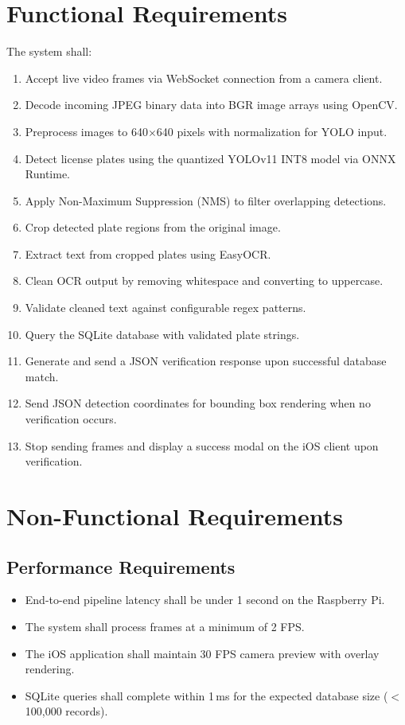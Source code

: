 \documentclass[11pt]{report}
\begin{document}
\section{Functional Requirements}
The system shall:
\begin{enumerate}
    \item Accept live video frames via WebSocket connection from a camera client.
    \item Decode incoming JPEG binary data into BGR image arrays using OpenCV.
    \item Preprocess images to 640$\times$640 pixels with normalization for YOLO input.
    \item Detect license plates using the quantized YOLOv11 INT8 model via ONNX Runtime.
    \item Apply Non-Maximum Suppression (NMS) to filter overlapping detections.
    \item Crop detected plate regions from the original image.
    \item Extract text from cropped plates using EasyOCR.
    \item Clean OCR output by removing whitespace and converting to uppercase.
    \item Validate cleaned text against configurable regex patterns.
    \item Query the SQLite database with validated plate strings.
    \item Generate and send a JSON verification response upon successful database match.
    \item Send JSON detection coordinates for bounding box rendering when no verification occurs.
    \item Stop sending frames and display a success modal on the iOS client upon verification.
\end{enumerate}

\section{Non-Functional Requirements}
\subsection{Performance Requirements}
\begin{itemize}
    \item End-to-end pipeline latency shall be under 1 second on the Raspberry Pi.
    \item The system shall process frames at a minimum of 2 FPS.
    \item The iOS application shall maintain 30 FPS camera preview with overlay rendering.
    \item SQLite queries shall complete within 1\,ms for the expected database size ($<$100,000 records).
\end{itemize}
\end{document}
